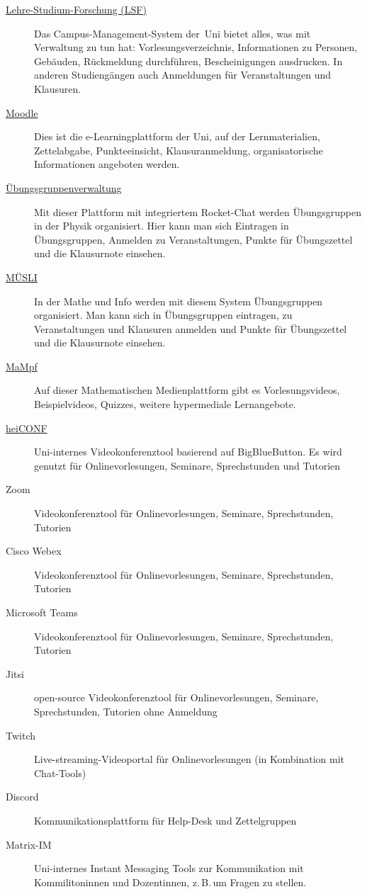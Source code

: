 \begin{description}
	\item[\href{https://lsf.uni-heidelberg.de/}{Lehre-Studium-Forschung (LSF)}] Das Campus-Management-System der~Uni bietet alles, was mit Verwaltung zu tun hat: Vorlesungsverzeichnis, Informationen zu Personen, Gebäuden, Rückmeldung durchführen, Bescheinigungen ausdrucken. In anderen Studiengängen auch Anmeldungen für Veranstaltungen und Klausuren.
	\item[\href{https://moodle.uni-heidelberg.de}{Moodle}] Dies ist die e-Learningplattform der Uni, auf der Lernmaterialien, Zettelabgabe, Punkteeinsicht, Klausuranmeldung, organisatorische Informationen angeboten werden.
	\item[\href{https://uebungen.physik.uni-heidelberg.de}{Übungsgruppenverwaltung}] Mit dieser Plattform mit integriertem Rocket-Chat werden Übungsgruppen in der Physik organisiert. Hier kann man sich Eintragen in Übungsgruppen, Anmelden zu Veranstaltungen, Punkte für Übungszettel und die Klausurnote einsehen.
	\item[\href{https://muesli.mathi.uni-heidelberg.de}{MÜSLI}] In der Mathe und Info werden mit diesem System Übungsgruppen organisiert. Man kann sich in Übungsgruppen eintragen, zu Veranstaltungen und Klausuren anmelden und Punkte für Übungszettel und die Klausurnote einsehen.
	\item[\href{https://mampf.mathi.uni-heidelberg.de}{MaMpf}] Auf dieser Mathematischen Medienplattform gibt es Vorlesungsvideos, Beispielvideos, Quizzes, weitere hypermediale Lernangebote.
	\item[\href{https://heiconf.uni-heidelberg.de}{heiCONF}] Uni-internes Videokonferenztool basierend auf BigBlueButton. Es wird genutzt für Onlinevorlesungen, Seminare, Sprechstunden und Tutorien
	\item[Zoom] Videokonferenztool für Onlinevorlesungen, Seminare, Sprechstunden, Tutorien
	\item[Cisco Webex] Videokonferenztool für Onlinevorlesungen, Seminare, Sprechstunden, Tutorien
	\item[Microsoft Teams] Videokonferenztool für Onlinevorlesungen, Seminare, Sprechstunden, Tutorien
	\item[Jitsi] open-source Videokonferenztool für Onlinevorlesungen, Seminare, Sprechstunden, Tutorien ohne Anmeldung
	\item[Twitch] Live-streaming-Videoportal für Onlinevorlesungen (in Kombination mit Chat-Tools)
	\item[Discord] Kommunikationsplattform für Help-Desk und Zettelgruppen
	\item[Matrix-IM] Uni-internes Instant Messaging Tools zur Kommunikation mit Kommilitoninnen und Dozentinnen, z.\,B.\,um Fragen zu stellen.
\end{description}


